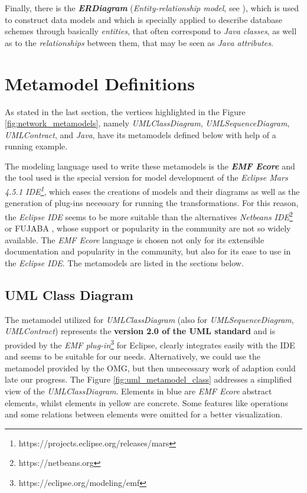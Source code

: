 \documentclass[tuberlin,cic,tc,english,noabntcite, oneside]{iiufrgs}
\begin{document}
Finally, there is the \textbf{\emph{ERDiagram}} (\emph{Entity-relationship model}, see \citealp{chen1976entity}), which is used to construct data models and which is specially applied to describe database schemes through basically \emph{entities}, that often correspond to \emph{Java classes}, as well as to the \emph{relationships} between them, that may be seen as \emph{Java attributes}.

\section{Metamodel Definitions}
\label{sec:MetamodelDefinitions}
As stated in the last section, the vertices highlighted in the Figure \ref{fig:network_metamodels}, namely \emph{UMLClassDiagram}, \emph{UMLSequenceDiagram}, \emph{UMLContract}, and \emph{Java}, have its metamodels defined below with help of a running example.

The modeling language used to write these metamodels is the \textbf{\emph{EMF Ecore}} and the tool used is the special version for model development of the \emph{Eclipse Mars 4.5.1 IDE\footnote{https://projects.eclipse.org/releases/mars}}, which eases the creations of models and their diagrams as well as the generation of plug-ins necessary for running the transformations. For this reason, the \emph{Eclipse IDE} seems to be more suitable than the alternatives \emph{Netbeans IDE}\footnote{https://netbeans.org} or FUJABA \citep{nickel2000fujaba}, whose support or popularity in the community are not so widely available. The \emph{EMF Ecore} language is chosen not only for its extensible documentation and popularity in the community, but also for its ease to use in the \emph{Eclipse IDE}. The metamodels are listed in the sections below.

\subsection{UML Class Diagram}
The metamodel utilized for \emph{UMLClassDiagram} (also for \emph{UMLSequenceDiagram}, \emph{UMLContract}) represents the \textbf{version 2.0 of the UML standard} and is provided by the \emph{EMF plug-in}\footnote{https://eclipse.org/modeling/emf} for Eclipse, clearly integrates easily with the IDE and seems to be suitable for our needs. Alternatively, we could use the metamodel provided by the OMG, but then unnecessary work of adaption could late our progress. The Figure \ref{fig:uml_metamodel_class} addresses a simplified view of the \emph{UMLClassDiagram}. Elements in blue are \emph{EMF Ecore} abstract elements, whilst elements in yellow are concrete. Some features like operations and some relations between elements were omitted for a better visualization. 
\end{document}
